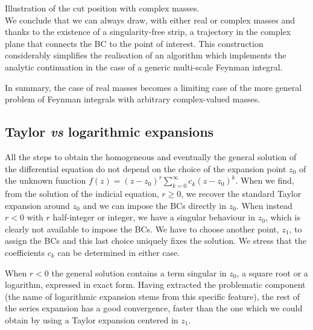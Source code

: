 Illustration of the cut position with complex masses.\\

We conclude that we can always draw,
with either real or complex masses and thanks to the existence
of a singularity-free strip,
a trajectory in the complex plane that connects the BC to the point of interest.
This construction considerably simplifies the realisation of an algorithm which
implements the analytic continuation in the case of a generic multi-scale
Feynman integral.










In summary, the case of real masses becomes a limiting case of the more
general problem of Feynman integrals with arbitrary complex-valued masses.



\subsection{Taylor {\it vs} logarithmic expansions }
All the steps to obtain the homogeneous and eventually the general solution
of the differential equation
do not depend on the choice of the expansion point $z_0$
of the unknown function $f(z)=(z-z_0)^r \sum_{k=0}^\infty c_k (z-z_0)^k$.
When we find, from the solution of the indicial equation, $r\geq 0$,
we recover the standard Taylor expansion around $z_0$ and
we can impose the BCs directly in $z_0$.
When instead $r<0$ with $r$ half-integer or integer,
we have a singular behaviour in $z_0$,
which is clearly not available to impose the BCs.
We have to choose another point, $z_1$, to assign the BCs
and this last choice uniquely fixes the solution.
We stress that the coefficients $c_k$ can be determined in either case.

When $r<0$ the general solution contains a term singular in $z_0$,
a square root or a logarithm, expressed in exact form.
Having extracted the problematic component
(the name of logarithmic expansion stems from this specific feature),
the rest of the series expansion has a good convergence,
faster than the one which we could obtain
by using a Taylor expansion centered in $z_1$.


